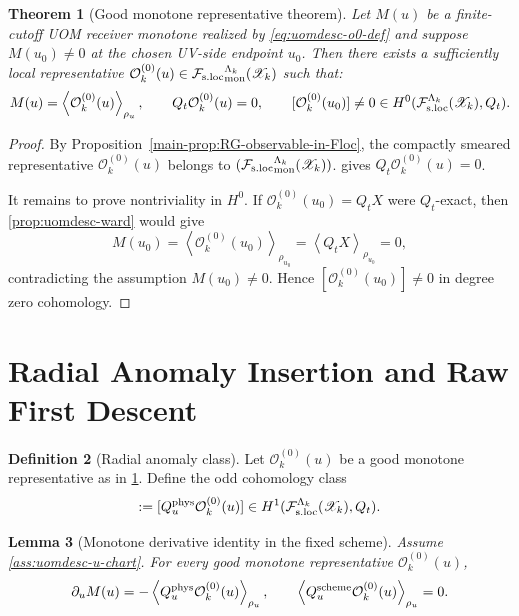 \documentclass[11pt]{article}
\theoremstyle{definition}
\newtheorem{definition}{Definition}[section]
\theoremstyle{plain}
\newtheorem{theorem}[definition]{Theorem}
\newtheorem{lemma}[definition]{Lemma}
\theoremstyle{remark}
\newcommand{\Fsloc}{\mathcal F_{\rm s.loc}}
\newcommand{\Xscr}{\mathscr X}
\newcommand{\Ozero}{\mathcal O^{(0)}}
\newcommand{\Aone}{\mathcal A^{(1)}}
\newcommand{\Qt}{Q_t}
\newcommand{\Quphys}{Q_u^{\rm phys}}
\newcommand{\Quscheme}{Q_u^{\rm scheme}}
\newcommand{\pair}[1]{\left\langle #1 \right\rangle}
\begin{document}
\begin{theorem}[Good monotone representative theorem]
\label{thm:uomdesc-good-o0}
Let \(M(u)\) be a finite-cutoff UOM receiver monotone realized by
\eqref{eq:uomdesc-o0-def} and suppose \(M(u_0)\neq 0\) at the chosen UV-side endpoint \(u_0\).
Then there exists a sufficiently local representative \(\Ozero_k(u)\in
{\Fsloc}_{\rm mon}^{\Lambda_k}(\Xscr_k)\) such that:
\[
M(u)=\pair{\Ozero_k(u)}_{\rho_u},
\qquad
\Qt \Ozero_k(u)=0,
\qquad
[\Ozero_k(u_0)]\neq 0\in H^0(\Fsloc^{\Lambda_k}(\Xscr_k),\Qt).
\]
\end{theorem}

\begin{proof}
By Proposition~\ref{main-prop:RG-observable-in-Floc}, the compactly smeared representative
\(\Ozero_k(u)\) belongs to \(({\Fsloc}_{\rm mon}^{\Lambda_k}(\Xscr_k))\).
 gives \(\Qt \Ozero_k(u)=0\).

It remains to prove nontriviality in \(H^0\).
If \(\Ozero_k(u_0)=\Qt X\) were \(\Qt\)-exact, then \cref{prop:uomdesc-ward} would give
\[
M(u_0)=\pair{\Ozero_k(u_0)}_{\rho_{u_0}}
=
\pair{\Qt X}_{\rho_{u_0}}
=0,
\]
contradicting the assumption \(M(u_0)\neq 0\).
Hence \([\Ozero_k(u_0)]\neq 0\) in degree zero cohomology.
\end{proof}

\section{Radial Anomaly Insertion and Raw First Descent}
\label{sec:uomdesc-descent}

\begin{definition}[Radial anomaly class]
\label{def:uomdesc-a1}
Let \(\Ozero_k(u)\) be a good monotone representative as in
\cref{thm:uomdesc-good-o0}.
Define the odd cohomology class
\begin{equation}
[\Aone_k(u)]
:=
[\Quphys \Ozero_k(u)]
\in
H^1(\Fsloc^{\Lambda_k}(\Xscr_k),\Qt).
\label{eq:uomdesc-a1-class}
\end{equation}
\end{definition}

\begin{lemma}[Monotone derivative identity in the fixed scheme]
\label{lem:uomdesc-monotone-derivative}
Assume \cref{ass:uomdesc-u-chart}.
For every good monotone representative \(\Ozero_k(u)\),
\[
\partial_u M(u)=-\pair{\Quphys\Ozero_k(u)}_{\rho_u},
\qquad
\pair{\Quscheme\Ozero_k(u)}_{\rho_u}=0.
\]
\end{lemma}
\end{document}
